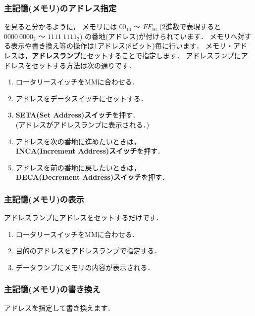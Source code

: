 \subsubsection{主記憶(メモリ)のアドレス指定}
を見ると分かるように，
メモリには $00_{16}$ 〜 $FF_{16}$
 (2進数で表現すると $0000~0000_{2}$ 〜 $1111~1111_{2}$)
の番地(アドレス)が付けられています．
メモリへ対する表示や書き換え等の操作は1アドレス(8ビット)毎に行います．
メモリ・アドレスは，{\bf アドレスランプ}にセットすることで指定します．
アドレスランプにアドレスをセットする方法は次の通りです．

\begin{enumerate}
\item ロータリースイッチをMMに合わせる．
\item アドレスをデータスイッチにセットする．
\item {\bf SETA(Set Address)スイッチ}を押す．\\
(アドレスがアドレスランプに表示される．)
\item アドレスを次の番地に進めたいときは，\\
{\bf INCA(Increment Address)スイッチ}を押す．
\item アドレスを前の番地に戻したいときは，\\
{\bf DECA(Decrement Address)スイッチ}を押す．
\end{enumerate}

\subsubsection{主記憶(メモリ)の表示}
アドレスランプにアドレスをセットするだけです．

\begin{enumerate}
\item ロータリースイッチをMMに合わせる．
\item 目的のアドレスをアドレスランプで指定する．
\item データランプにメモリの内容が表示される．
\end{enumerate}

\subsubsection{主記憶(メモリ)の書き換え}
アドレスを指定して書き換えます．

